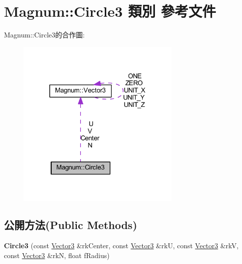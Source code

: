 \hypertarget{class_magnum_1_1_circle3}{}\section{Magnum\+:\+:Circle3 類別 參考文件}
\label{class_magnum_1_1_circle3}


Magnum\+:\+:Circle3的合作圖\+:\nopagebreak
\begin{figure}[H]
\begin{center}
\leavevmode
\includegraphics[width=226pt]{class_magnum_1_1_circle3__coll__graph}
\end{center}
\end{figure}
\subsection*{公開方法(Public Methods)}
\begin{DoxyCompactItemize}
\item 
{\bfseries Circle3} (const \hyperlink{class_magnum_1_1_vector3}{Vector3} \&rk\+Center, const \hyperlink{class_magnum_1_1_vector3}{Vector3} \&rkU, const \hyperlink{class_magnum_1_1_vector3}{Vector3} \&rkV, const \hyperlink{class_magnum_1_1_vector3}{Vector3} \&rkN, float f\+Radius)\hypertarget{class_magnum_1_1_circle3_a072dd11008f051a0a241f359418f4cd6}{}\label{class_magnum_1_1_circle3_a072dd11008f051a0a241f359418f4cd6}

\end{DoxyCompactItemize}
